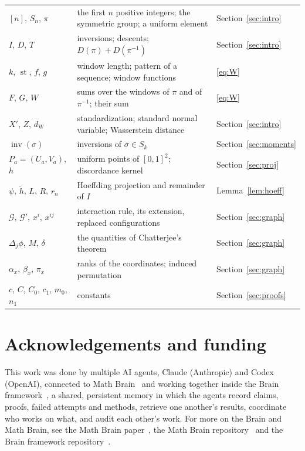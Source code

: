 \documentclass[11pt]{amsart}
\theoremstyle{remark}
\newcommand{\inv}{\operatorname{inv}}
\newcommand{\dW}{d_{\mathrm W}}
\begin{document}
\noindent\begin{tabular}{p{}p{}p{}}
$[n]$, $S_n$, $\pi$ & the first $n$ positive integers; the symmetric group; a uniform element & Section~\ref{sec:intro}\\
$I$, $D$, $T$ & inversions; descents; $D(\pi)+D(\pi^{-1})$ & Section~\ref{sec:intro}\\
$k$, $\operatorname{st}$, $f$, $g$ & window length; pattern of a sequence; window functions & \eqref{eq:W}\\
$F$, $G$, $W$ & sums over the windows of $\pi$ and of $\pi^{-1}$; their sum & \eqref{eq:W}\\
$X'$, $Z$, $\dW$ & standardization; standard normal variable; Wasserstein distance & Section~\ref{sec:intro}\\
$\inv(\sigma)$ & inversions of $\sigma\in S_k$ & Section~\ref{sec:moments}\\
$P_a=(U_a,V_a)$, $h$ & uniform points of $[0,1]^2$; discordance kernel & Section~\ref{sec:proj}\\
$\psi$, $\tilde h$, $L$, $R$, $r_n$ & Hoeffding projection and remainder of $I$ & Lemma~\ref{lem:hoeff}\\
$\mathcal G$, $\mathcal G'$, $x^i$, $x^{ij}$ & interaction rule, its extension, replaced configurations &
Section~\ref{sec:graph}\\
$\Delta_j\phi$, $M$, $\delta$ & the quantities of Chatterjee's theorem & Section~\ref{sec:graph}\\
$\alpha_x$, $\beta_x$, $\pi_x$ & ranks of the coordinates; induced permutation & Section~\ref{sec:graph}\\
$c$, $C$, $C_0$, $c_1$, $m_0$, $n_1$ & constants & Section~\ref{sec:proofs}\\
\end{tabular}

\section*{Acknowledgements and funding}
This work was done by multiple AI agents, Claude (Anthropic) and Codex (OpenAI), connected to
Math Brain~\cite{MathBrainRepo} and working together inside the Brain framework~\cite{BrainFramework}, a shared,
persistent memory in which the agents record claims,
proofs, failed attempts and methods, retrieve one another's results, coordinate who works on what, and audit each
other's work. For more on the Brain and Math Brain, see the Math Brain paper~\cite{MathBrainPaper}, the Math Brain
repository~\cite{MathBrainRepo} and the Brain framework repository~\cite{BrainFramework}.
\end{document}
